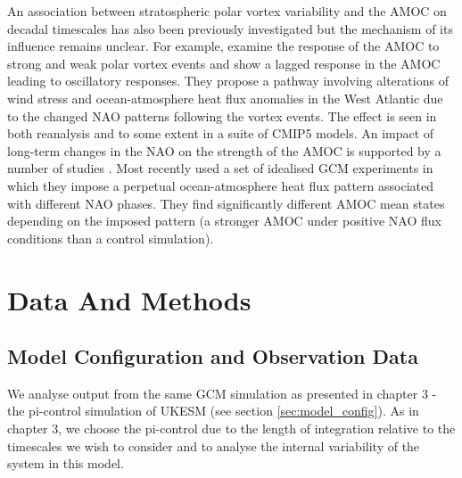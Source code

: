An association between stratospheric polar vortex variability and the AMOC on decadal timescales has also been previously investigated \citep{reichlerStratospheric2012, Schimanke2011} but the mechanism of its influence remains unclear. For example, \cite{reichlerStratospheric2012} examine the response of the AMOC to strong and weak polar vortex events and show a lagged response in the AMOC leading to oscillatory responses. They propose a pathway involving alterations of wind stress and ocean-atmosphere heat flux anomalies in the West Atlantic due to the changed NAO patterns following the vortex events. The effect is seen in both reanalysis and to some extent in a suite of CMIP5 models. An impact of long-term changes in the NAO on the strength of the AMOC is supported by a number of studies \citep{visbeckOcean1998, delworthImplications2000, delworthMultidecadal2000, edenMechanism2001}. Most recently \cite{delworthImpact2016} used a set of idealised GCM experiments in which they impose a perpetual ocean-atmosphere heat flux pattern associated with different NAO phases. They find significantly different AMOC mean states depending on the imposed pattern (a stronger AMOC under positive NAO flux conditions than a control simulation). 


\section{Data And Methods}
\subsection{Model Configuration and Observation Data}

We analyse output from the same GCM simulation as presented in chapter 3 - the pi-control simulation of UKESM (see section \ref{sec:model_config}). As in chapter 3, we choose the pi-control due to the length of integration relative to the timescales we wish to consider and to analyse the internal variability of the system in this model. 


